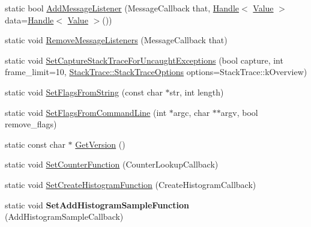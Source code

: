 \begin{DoxyCompactItemize}
\item 
static bool \hyperlink{classv8_1_1V8_a125dadf8feb6178a42333f2a6412ea73}{Add\-Message\-Listener} (Message\-Callback that, \hyperlink{classv8_1_1Handle}{Handle}$<$ \hyperlink{classv8_1_1Value}{Value} $>$ data=\hyperlink{classv8_1_1Handle}{Handle}$<$ \hyperlink{classv8_1_1Value}{Value} $>$())
\item 
static void \hyperlink{classv8_1_1V8_a024f57744e8dfdcb2ea1417024b4805c}{Remove\-Message\-Listeners} (Message\-Callback that)
\item 
static void \hyperlink{classv8_1_1V8_a9998ccddad62571d73039ea12f598236}{Set\-Capture\-Stack\-Trace\-For\-Uncaught\-Exceptions} (bool capture, int frame\-\_\-limit=10, \hyperlink{classv8_1_1StackTrace_a9704e4a37949eb8eb8ccddbddf161492}{Stack\-Trace\-::\-Stack\-Trace\-Options} options=Stack\-Trace\-::k\-Overview)
\item 
static void \hyperlink{classv8_1_1V8_ab263a85e6f97ea79d944bd20bb09a95f}{Set\-Flags\-From\-String} (const char $\ast$str, int length)
\item 
static void \hyperlink{classv8_1_1V8_a63157ad9284ffad1c0ab62b21aadd08c}{Set\-Flags\-From\-Command\-Line} (int $\ast$argc, char $\ast$$\ast$argv, bool remove\-\_\-flags)
\item 
static const char $\ast$ \hyperlink{classv8_1_1V8_afcecc0e9e8b5fa17a06a93f7b5a7538d}{Get\-Version} ()
\item 
static void \hyperlink{classv8_1_1V8_a830d3ba2704b6e7c361188b22318c0be}{Set\-Counter\-Function} (Counter\-Lookup\-Callback)
\item 
static void \hyperlink{classv8_1_1V8_ac4db0dff0f29c750d30fcac65c4d1968}{Set\-Create\-Histogram\-Function} (Create\-Histogram\-Callback)
\item 
\hypertarget{classv8_1_1V8_acbd552ca4282f1a7648c221aa70ff93e}{static void {\bfseries Set\-Add\-Histogram\-Sample\-Function} (Add\-Histogram\-Sample\-Callback)}\label{classv8_1_1V8_acbd552ca4282f1a7648c221aa70ff93e}


\end{DoxyCompactItemize}
